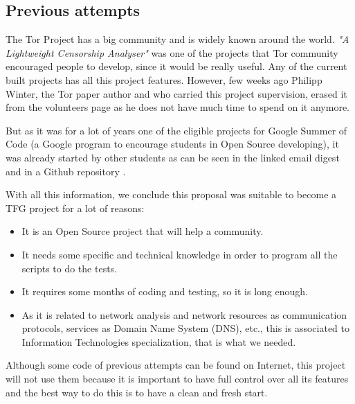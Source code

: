 \subsection{Previous attempts}
The Tor Project has a big community and is widely known around the world. \textit{"A Lightweight Censorship Analyser"} was one of the projects that Tor community encouraged people to develop, since it would be really useful. Any of the current built projects has all this project features. However, few weeks ago Philipp Winter, the Tor paper author and who carried this project supervision, erased it from the volunteers page as he does not have much time to spend on it anymore. 

But as it was for a lot of years one of the eligible projects for Google Summer of Code (a Google program to encourage students in Open Source developing), it was already started by other students as can be seen in the linked email digest \cite{TorDevMail} and in a Github repository \cite{OtherRepo}. 

With all this information, we conclude this proposal was suitable to become a TFG project for a lot of reasons:
\begin{itemize}
\item It is an Open Source project that will help a community.
\item It needs some specific and technical knowledge in order to program all the scripts to do the tests.
\item It requires some months of coding and testing, so it is long enough.
\item As it is related to network analysis and network resources as communication protocols, services as Domain Name System (DNS), etc., this is associated to Information Technologies specialization, that is what we needed.
\end{itemize}

Although some code of previous attempts can be found on Internet, this project will not use them because it is important to have full control over all its features and the best way to do this is to have a clean and fresh start.
